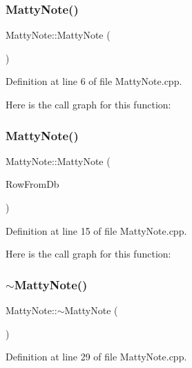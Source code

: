 \subsubsection{\texorpdfstring{Matty\+Note()}{MattyNote()}\hspace{0.1cm}{\footnotesize\ttfamily [1/2]}}
{\footnotesize\ttfamily Matty\+Note\+::\+Matty\+Note (\begin{DoxyParamCaption}{ }\end{DoxyParamCaption})}



Definition at line 6 of file Matty\+Note.\+cpp.

Here is the call graph for this function\+:
\hypertarget{classMattyNote_a101e9c2475ee2567dfa2e168b543806f}{}\label{classMattyNote_a101e9c2475ee2567dfa2e168b543806f} 
\subsubsection{\texorpdfstring{Matty\+Note()}{MattyNote()}\hspace{0.1cm}{\footnotesize\ttfamily [2/2]}}
{\footnotesize\ttfamily Matty\+Note\+::\+Matty\+Note (\begin{DoxyParamCaption}\item[{Q\+String\+List}]{Row\+From\+Db }\end{DoxyParamCaption})}



Definition at line 15 of file Matty\+Note.\+cpp.

Here is the call graph for this function\+:
\hypertarget{classMattyNote_a2831641523b4a0d5c36100689f95c912}{}\label{classMattyNote_a2831641523b4a0d5c36100689f95c912} 
\subsubsection{\texorpdfstring{$\sim$\+Matty\+Note()}{~MattyNote()}}
{\footnotesize\ttfamily Matty\+Note\+::$\sim$\+Matty\+Note (\begin{DoxyParamCaption}{ }\end{DoxyParamCaption})}



Definition at line 29 of file Matty\+Note.\+cpp.



